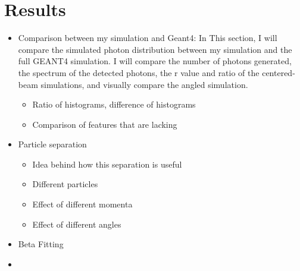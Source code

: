 
\chapter{Results}
\label{ch:Results}
\begin{itemize}
\item Comparison between my simulation and Geant4: 
In This section, I will compare the simulated photon distribution between my simulation and the full GEANT4 simulation. I will compare the number of photons generated, the spectrum of the detected photons, the r value and ratio of the centered-beam simulations, and visually compare the angled simulation.
	\begin{itemize}
	\item Ratio of histograms, difference of histograms
	\item Comparison of features that are lacking
	\end{itemize}
\item Particle separation
	\begin{itemize}
	\item Idea behind how this separation is useful
	\item Different particles
	\item Effect of different momenta
	\item Effect of different angles
	\end{itemize}
\item Beta Fitting
\item 
\end{itemize}
\endinput

Any text after an \endinput is ignored.
You could put scraps here or things in progress.
